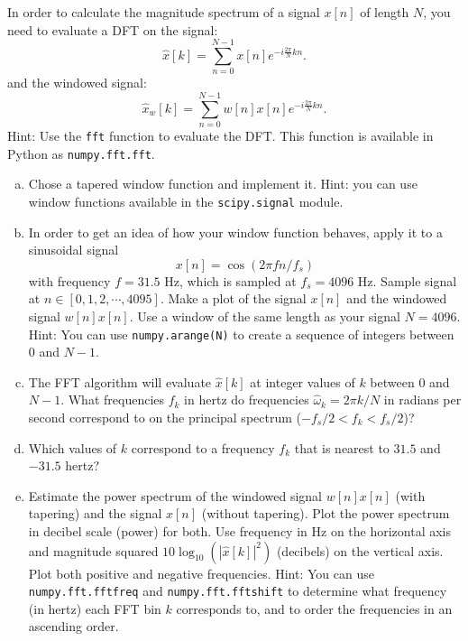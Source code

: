 In order to calculate the magnitude spectrum of a signal $x[n]$ of length $N$, you need to evaluate a DFT on the signal:
\begin{equation}
\hat{x}[k] = \sum_{n=0}^{N-1} x[n] e^{-i\frac{2\pi}{N}kn}.
\label{one}
\end{equation}
and the windowed signal:
\begin{equation}
\hat{x}_w[k] = \sum_{n=0}^{N-1} w[n]x[n] e^{-i\frac{2\pi}{N}kn}.
\end{equation}
Hint: Use the \verb|fft| function to evaluate the
DFT. This function is available in Python as \verb|numpy.fft.fft|.


\begin{enumerate}[a)]
\item Chose a tapered window function and implement it. Hint: you can use window functions available in the \verb|scipy.signal| module.

\item In order to get an idea of how your window function behaves,
  apply it to a sinusoidal signal
\begin{equation}
  x[n]=\cos(2\pi f  n/f_s)
\end{equation}
  with frequency $f=31.5$ Hz, which is sampled at $f_s=4096$
  Hz. Sample signal at $n\in[0,1,2,\cdots,4095]$. Make a plot of the
  signal $x[n]$ and the windowed signal $w[n]x[n]$. Use a window of
  the same length as your signal $N=4096$. Hint: You can use \verb|numpy.arange(N)| to create a sequence of integers between $0$ and $N-1$.

\item The FFT algorithm will evaluate $\hat{x}[k]$ at integer values of $k$ between $0$ and $N-1$. What frequencies $f_k$ in hertz do frequencies $\hat{\omega}_k = 2\pi k/N$ in radians per second correspond to on the principal spectrum ($-f_s/2 < f_k < f_s/2$)? 

\item Which values of $k$ correspond to a frequency $f_k$ that is nearest to $31.5$ and $-31.5$ hertz?

\item Estimate the power spectrum of the windowed signal $w[n]x[n]$ (with tapering) and the
  signal $x[n]$ (without tapering). Plot the power spectrum in decibel scale (power) for both.
  Use frequency in Hz on the horizontal axis and magnitude squared
  $10 \log_{10}(|\hat{x}[k]|^2)$ (decibels) on the vertical axis.  Plot both positive and negative frequencies. Hint: You can use \verb|numpy.fft.fftfreq| and \verb|numpy.fft.fftshift| to determine what frequency (in hertz) each FFT bin $k$ corresponds to, and to order the frequencies in an ascending order.


\end{enumerate}
